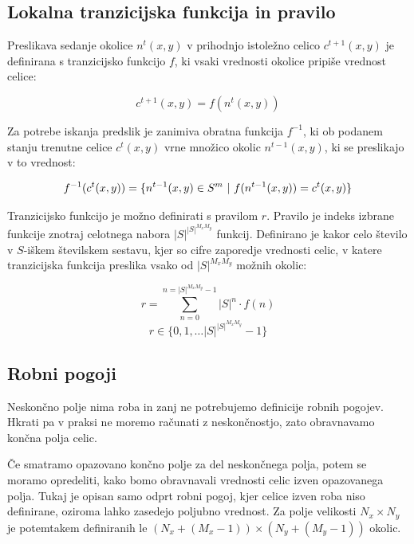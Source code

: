 \documentclass[12pt,a4paper,openany,twoside]{book}
\begin{document}
\subsection{Lokalna tranzicijska funkcija in pravilo}

Preslikava sedanje okolice \(n^{t}(x,y)\) v prihodnjo istoležno celico \(c^{t+1}(x,y)\) je definirana
s tranzicijsko funkcijo \(f\), ki vsaki vrednosti okolice pripiše vrednost celice:

\begin{equation}
c^{t+1}(x,y) = f(n^{t}(x,y))
\end{equation}

Za potrebe iskanja predslik je zanimiva obratna funkcija \(f^{-1}\), ki ob
podanem stanju trenutne celice \(c^{t}(x,y)\) vrne množico okolic \(n^{t-1}(x,y)\),
ki se preslikajo v to vrednost:

\begin{equation}
f^{-1}(c^{t}(x,y)) = \{ n^{t-1}(x,y) \in S^m \ \arrowvert \ f(n^{t-1}(x,y)) = c^{t}(x,y) \}
\end{equation}

Tranzicijsko funkcijo je možno definirati s pravilom  \(r\).
Pravilo je indeks izbrane funkcije znotraj celotnega nabora \(|S|^{|S|^{M_x M_y}}\) funkcij.
Definirano je kakor celo število v \(S\)-iškem številskem sestavu,
kjer so cifre zaporedje vrednosti celic, v katere tranzicijska funkcija
preslika vsako od \(|S|^{M_x M_y}\) možnih okolic:

\begin{equation}
r = \sum_{n=0}^{n=|S|^{M_x M_y}-1} |S|^n \cdot f(n)
\end{equation}
\begin{equation}
r \in \{0, 1, \ldots |S|^{|S|^{M_x M_y}}-1\}
\end{equation}

\subsection{Robni pogoji}

Neskončno polje nima roba in zanj ne potrebujemo definicije robnih pogojev.
Hkrati pa v praksi ne moremo računati z neskončnostjo,
zato obravnavamo končna polja celic.

Če smatramo opazovano končno polje za del neskončnega polja,
potem se moramo opredeliti, kako bomo obravnavali vrednosti celic izven opazovanega polja.
Tukaj je opisan samo odprt robni pogoj, kjer celice izven roba niso definirane,
oziroma lahko zasedejo poljubno vrednost.
Za polje velikosti \(N_x \times N_y\) je potemtakem definiranih le \((N_x+(M_x-1)) \times (N_y+(M_y-1))\) okolic.
\end{document}
